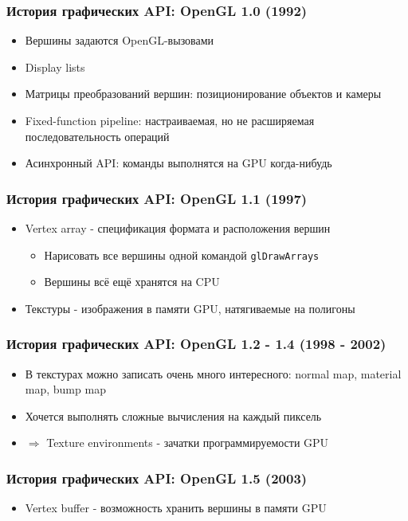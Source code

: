 \documentclass{beamer}
\begin{document}
\begin{frame}
\frametitle{История графических API: OpenGL 1.0 (1992)}
\begin{itemize}
\item Вершины задаются OpenGL-вызовами
\item Display lists
\item Матрицы преобразований вершин: позиционирование объектов и камеры
\item Fixed-function pipeline: настраиваемая, но не расширяемая последовательность операций
\item Асинхронный API: команды выполнятся на GPU когда-нибудь
\end{itemize}
\end{frame}

\begin{frame}[fragile]
\frametitle{История графических API: OpenGL 1.1 (1997)}
\begin{itemize}
\item Vertex array - спецификация формата и расположения вершин
\begin{itemize}
\item Нарисовать все вершины одной командой \verb|glDrawArrays|
\item Вершины всё ещё хранятся на CPU
\end{itemize}
\pause
\item Текстуры - изображения в памяти GPU, натягиваемые на полигоны
\end{itemize}
\end{frame}

\begin{frame}
\frametitle{История графических API: OpenGL 1.2 - 1.4 (1998 - 2002)}
\begin{itemize}
\item В текстурах можно записать очень много интересного: normal map, material map, bump map
\item Хочется выполнять сложные вычисления на каждый пиксель
\item $\Longrightarrow$ Texture environments - зачатки программируемости GPU
\end{itemize}
\end{frame}

\begin{frame}
\frametitle{История графических API: OpenGL 1.5 (2003)}
\begin{itemize}
\item Vertex buffer - возможность хранить вершины в памяти GPU
\end{itemize}
\end{frame}
\end{document}
